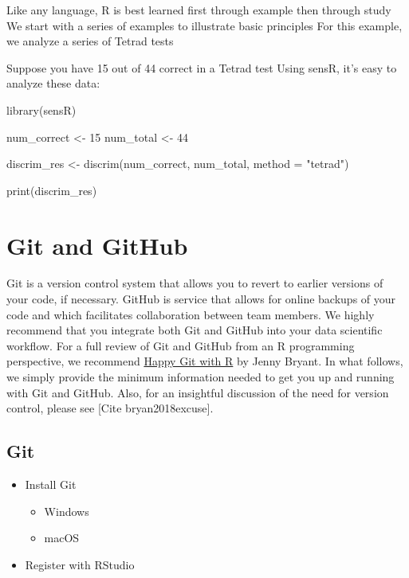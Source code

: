 \documentclass[
]{book}
\newenvironment{Shaded}{\begin{snugshade}}{\end{snugshade}}
\newcommand{\AttributeTok}[1]{\textcolor[rgb]{0.77,0.63,0.00}{#1}}
\newcommand{\DecValTok}[1]{\textcolor[rgb]{0.00,0.00,0.81}{#1}}
\newcommand{\FunctionTok}[1]{\textcolor[rgb]{0.00,0.00,0.00}{#1}}
\newcommand{\NormalTok}[1]{#1}
\newcommand{\OtherTok}[1]{\textcolor[rgb]{0.56,0.35,0.01}{#1}}
\newcommand{\StringTok}[1]{\textcolor[rgb]{0.31,0.60,0.02}{#1}}
\providecommand{\tightlist}{%
  \setlength{\itemsep}{0pt}\setlength{\parskip}{0pt}}
\begin{document}
Like any language, R is best learned first through example then through study
We start with a series of examples to illustrate basic principles
For this example, we analyze a series of Tetrad tests

Suppose you have 15 out of 44 correct in a Tetrad test
Using sensR, it's easy to analyze these data:

\begin{Shaded}
\begin{Highlighting}[]
\FunctionTok{library}\NormalTok{(sensR)}

\NormalTok{num\_correct }\OtherTok{\textless{}{-}} \DecValTok{15}  
\NormalTok{num\_total }\OtherTok{\textless{}{-}} \DecValTok{44}  
  
\NormalTok{discrim\_res }\OtherTok{\textless{}{-}} \FunctionTok{discrim}\NormalTok{(num\_correct, num\_total, }\AttributeTok{method =} \StringTok{"tetrad"}\NormalTok{)  }
  
\FunctionTok{print}\NormalTok{(discrim\_res)  }
\end{Highlighting}
\end{Shaded}

\hypertarget{git-and-github}{%
\section{Git and GitHub}\label{git-and-github}}

Git is a version control system that allows you to revert to earlier versions of your code, if necessary. GitHub is service that allows for online backups of your code and which facilitates collaboration between team members. We highly recommend that you integrate both Git and GitHub into your data scientific workflow. For a full review of Git and GitHub from an R programming perspective, we recommend \href{https://happygitwithr.com/}{Happy Git with R} by Jenny Bryant. In what follows, we simply provide the minimum information needed to get you up and running with Git and GitHub. Also, for an insightful discussion of the need for version control, please see {[}Cite bryan2018excuse{]}.

\hypertarget{git}{%
\subsection{Git}\label{git}}

\begin{itemize}
\tightlist
\item
  Install Git

  \begin{itemize}
  \tightlist
  \item
    Windows
  \item
    macOS
  \end{itemize}
\item
  Register with RStudio
\end{itemize}
\end{document}
